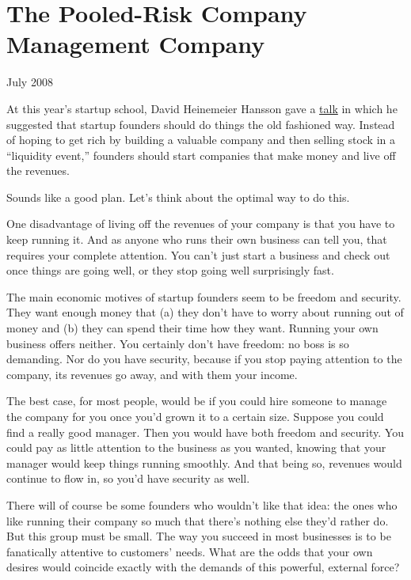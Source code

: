 \chapter{The Pooled-Risk Company Management Company}

July 2008

At this year's startup school, David Heinemeier Hansson gave a
\href{http://www.omnisio.com/startupschool08/david-heinemeier-hansson-at-startup-school-08}{talk}
in which he suggested that startup founders should do things the old
fashioned way. Instead of hoping to get rich by building a valuable
company and then selling stock in a ``liquidity event,'' founders should
start companies that make money and live off the revenues.

Sounds like a good plan. Let's think about the optimal way to do this.

One disadvantage of living off the revenues of your company is that you
have to keep running it. And as anyone who runs their own business can
tell you, that requires your complete attention. You can't just start a
business and check out once things are going well, or they stop going
well surprisingly fast.

The main economic motives of startup founders seem to be freedom and
security. They want enough money that (a) they don't have to worry about
running out of money and (b) they can spend their time how they want.
Running your own business offers neither. You certainly don't have
freedom: no boss is so demanding. Nor do you have security, because if
you stop paying attention to the company, its revenues go away, and with
them your income.

The best case, for most people, would be if you could hire someone to
manage the company for you once you'd grown it to a certain size.
Suppose you could find a really good manager. Then you would have both
freedom and security. You could pay as little attention to the business
as you wanted, knowing that your manager would keep things running
smoothly. And that being so, revenues would continue to flow in, so
you'd have security as well.

There will of course be some founders who wouldn't like that idea: the
ones who like running their company so much that there's nothing else
they'd rather do. But this group must be small. The way you succeed in
most businesses is to be fanatically attentive to customers' needs. What
are the odds that your own desires would coincide exactly with the
demands of this powerful, external force?

